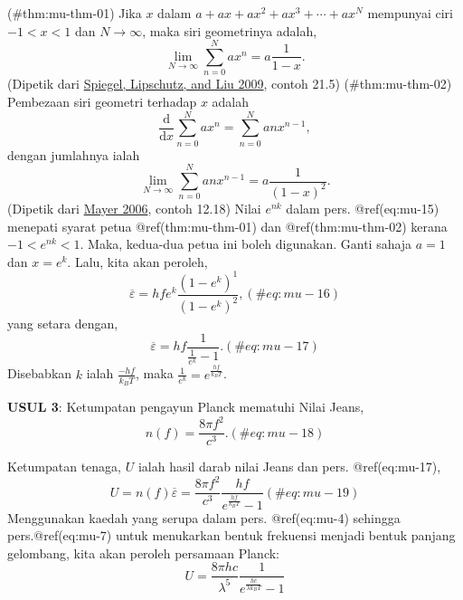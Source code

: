 \documentclass[
]{book}
\begin{document}
\protect\hypertarget{thm:mu-thm-01}{}{(\#thm:mu-thm-01) {} }Jika \(x\) dalam
\(a + ax + ax^2 + ax^3 + \cdots + ax^N\) mempunyai ciri \(-1<x<1\) dan
\(N\to\infty\), maka siri geometrinya adalah,
\[\lim_{N\to\infty}\sum_{n=0}^N ax^n = a\frac{1}{1-x}.\] (Dipetik dari
\protect\hyperlink{ref-spiegel2009}{Spiegel, Lipschutz, and Liu 2009},
contoh 21.5) 
\BeginKnitrBlock{theorem}{}
\protect\hypertarget{thm:mu-thm-02}{}{(\#thm:mu-thm-02)
{} }Pembezaan siri geometri
terhadap \(x\) adalah
\[\frac{\text{d}}{\text{d}x}\sum_{n=0}^{N}ax^n = \sum_{n=0}^{N} anx^{n-1},\]
dengan jumlahnya ialah
\[\lim_{N\to\infty}\sum_{n=0}^{N} anx^{n-1} = a\frac{1}{(1-x)^2}.\]
(Dipetik dari \protect\hyperlink{ref-Mayer2006}{Mayer 2006}, contoh
12.18)  Nilai \(e^{nk}\) dalam pers.
@ref(eq:mu-15) menepati syarat petua @ref(thm:mu-thm-01) dan
@ref(thm:mu-thm-02) kerana \(-1<e^{nk}<1\). Maka, kedua-dua petua ini
boleh digunakan. Ganti sahaja \(a=1\) dan \(x=e^k\). Lalu, kita akan
peroleh, \begin{equation}
\overline{\varepsilon} = hfe^k\frac{(1-e^k)^{1}}{(1-e^k)^{2}},
(\#eq:mu-16)
\end{equation} yang setara dengan, \begin{equation}
\overline\varepsilon= hf\frac{1}{\frac{1}{e^k}-1}.
(\#eq:mu-17)
\end{equation} Disebabkan \(k\) ialah \(\frac{-hf}{k_BT}\), maka
\(\frac{1}{e^k} = e^{\frac{hf}{k_BT}}\).

\textbf{USUL 3}: Ketumpatan pengayun Planck mematuhi Nilai Jeans,
\begin{equation}
n(f) = \frac{8\pi f^2}{c^3}.(\#eq:mu-18)
\end{equation}

Ketumpatan tenaga, \(U\) ialah hasil darab nilai Jeans dan pers.
@ref(eq:mu-17), \begin{equation}
U = n(f)\overline{\varepsilon} = \frac{8\pi f^2}{c^3}\frac{hf}{e^{\frac{hf}{k_BT}}-1}
(\#eq:mu-19)
\end{equation} Menggunakan kaedah yang serupa dalam pers. @ref(eq:mu-4)
sehingga pers.@ref(eq:mu-7) untuk menukarkan bentuk frekuensi menjadi
bentuk panjang gelombang, kita akan peroleh persamaan Planck:
\begin{equation}
U=\frac{8\pi hc}{\lambda^5}\frac{1}{e^{\frac{hc}{\lambda k_BT}}-1}
\end{equation}
\end{document}
